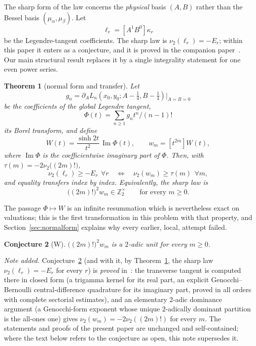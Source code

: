 \documentclass[10pt,a4paper]{amsart}
\newtheorem{theorem}{Theorem}[section]
\newtheorem{conjecture}[theorem]{Conjecture}
\newcommand{\Zt}{\mathbb Z_2}
\newcommand{\ma}{\mu_\alpha}
\newcommand{\mb}{\mu_\beta}
\begin{document}
The sharp form of the law concerns the \emph{physical} basis $(A,B)$ rather than the Bessel basis $(\ma,\mb)$.  Let
\[
  \ell_r=[A^1B^0]\kappa_r
\]
be the Legendre-tangent coefficients.  The sharp law is $\nu_2(\ell_r)=-E_r$; within this paper it enters as a conjecture, and it is proved in the companion paper~\cite{Ultraspherical}.  Our main structural result replaces it by a single integrality statement for one even power series.


\begin{theorem}[normal form and transfer]\label{thm:transferintro}
Let
\[
g_n=\partial_AL_n(x_0,y_0;A-\tfrac14,B-\tfrac14)\big|_{A=B=0}
\]
be the coefficients of the global Legendre tangent,
\[
\Phi(t)=\sum_{n\ge1}g_nt^n/(n-1)!
\]
its Borel transform, and define
\[
  W(t)=\frac{\sinh 2t}{t^2}\,\operatorname{Im}\Phi(t),\qquad   w_m=[t^{2m}]W(t),
\]
where $\operatorname{Im}\Phi$ is the coefficientwise imaginary part of
$\Phi$.  Then, with $\tau(m)=-2\nu_2\bigl((2m)!\bigr)$,
\[
  \nu_2(\ell_r)\ge-E_r\ \ \forall r   \quad\Longleftrightarrow\quad   \nu_2(w_m)\ge\tau(m)\ \ \forall m ,
\]
and equality transfers index by index.  Equivalently, the sharp law is
\[
  \bigl((2m)!\bigr)^2w_m\in\Zt^\times\qquad\text{for every }m\ge0 .
\]
\end{theorem}


The passage $\Phi\mapsto W$ is an infinite resummation which is nevertheless exact on valuations; this is the first transformation in this problem with that property, and Section~\ref{sec:normalform} explains why every earlier, local, attempt failed.

\begin{conjecture}[W]\label{conj:W}
$\bigl((2m)!\bigr)^2w_m$ is a $2$-adic unit for every $m\ge0$.
\end{conjecture}

\medskip\noindent\emph{Note added.}  Conjecture~\ref{conj:W} (and with it, by Theorem~\ref{thm:transferintro}, the sharp law $\nu_2(\ell_r)=-E_r$ for every $r$) is \emph{proved} in~\cite{Ultraspherical}: the transverse tangent is computed there in closed form (a trigamma kernel for its real part, an explicit Genocchi--Bernoulli central-difference quadrature for its imaginary part, proved in all orders with complete sectorial estimates), and an elementary $2$-adic dominance argument  (a Genocchi-form exponent whose unique $2$-adically dominant partition is the all-ones one) gives $\nu_2(w_m)=-2\nu_2((2m)!)$ for every $m$.  The statements and proofs of the present paper are unchanged and self-contained; where the text below refers to the conjecture as open, this note supersedes it.
\end{document}
